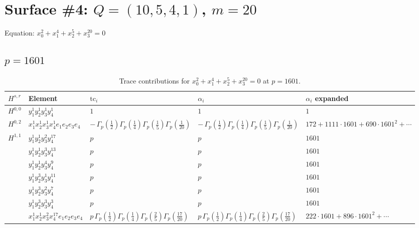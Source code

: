 \documentclass[11pt]{article}
\begin{document}
\newpage

\section*{Surface \#4: $Q=(10, 5, 4, 1)$, $m=20$}

Equation: $x_0^{2} + x_1^{4} + x_2^{5} + x_3^{20} = 0$

\subsection*{$p = 1601$}

\begin{table}[ht]
\centering
\caption{Trace contributions for $x_0^{2} + x_1^{4} + x_2^{5} + x_3^{20} = 0$ at $p=1601$.}\label{tab:diagonal-4}
\renewcommand{\arraystretch}{1.1}
{\scriptsize
\begin{tabular}{@{}lllll@{}}
\toprule
$H^{s,r}$ & Element & $\mathrm{tc}_i$ & $\alpha_i$ & $\alpha_i$ expanded \\
\midrule
$H^{0,0}$ & $y_{1}^{1} y_{2}^{1} y_{3}^{1} y_{4}^{1}$ & $1$ & $1$ & $1$ \\
\midrule
$H^{0,2}$ & $x_{1}^{1} x_{2}^{1} x_{3}^{1} x_{4}^{1}  e_{1} e_{2} e_{3} e_{4}$ & $- \, \Gamma_p \left( \frac{1}{2} \right) \Gamma_p \left( \frac{1}{4} \right) \Gamma_p \left( \frac{1}{5} \right) \Gamma_p \left( \frac{1}{20} \right)$ & $- \, \Gamma_p \left( \frac{1}{2} \right) \Gamma_p \left( \frac{1}{4} \right) \Gamma_p \left( \frac{1}{5} \right) \Gamma_p \left( \frac{1}{20} \right)$ & $172{+}1111{\cdot}1601{+}690{\cdot}1601^{2}{+}\cdots$ \\
\midrule
$H^{1,1}$ & $y_{1}^{1} y_{2}^{1} y_{3}^{2} y_{4}^{17}$ & $p \,$ & $p \,$ & $1601$ \\
 & $y_{1}^{1} y_{2}^{1} y_{3}^{3} y_{4}^{13}$ & $p \,$ & $p \,$ & $1601$ \\
 & $y_{1}^{1} y_{2}^{1} y_{3}^{4} y_{4}^{9}$ & $p \,$ & $p \,$ & $1601$ \\
 & $y_{1}^{1} y_{2}^{3} y_{3}^{1} y_{4}^{11}$ & $p \,$ & $p \,$ & $1601$ \\
 & $y_{1}^{1} y_{2}^{3} y_{3}^{2} y_{4}^{7}$ & $p \,$ & $p \,$ & $1601$ \\
 & $y_{1}^{1} y_{2}^{3} y_{3}^{3} y_{4}^{3}$ & $p \,$ & $p \,$ & $1601$ \\
 & $x_{1}^{1} x_{2}^{1} x_{3}^{2} x_{4}^{17}  e_{1} e_{2} e_{3} e_{4}$ & $p \, \Gamma_p \left( \frac{1}{2} \right) \Gamma_p \left( \frac{1}{4} \right) \Gamma_p \left( \frac{2}{5} \right) \Gamma_p \left( \frac{17}{20} \right)$ & $p \, \Gamma_p \left( \frac{1}{2} \right) \Gamma_p \left( \frac{1}{4} \right) \Gamma_p \left( \frac{2}{5} \right) \Gamma_p \left( \frac{17}{20} \right)$ & $222{\cdot}1601{+}896{\cdot}1601^{2}{+}\cdots$ \\

\end{tabular}}
\end{table}
\end{document}
